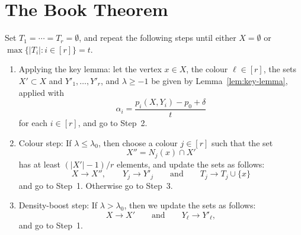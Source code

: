 
\section{The Book Theorem}


\begin{algorithm}\label{alg:book}
  Set \(T_1 = \cdots = T_r = \emptyset\), and repeat the following steps until either \(X = \emptyset\) or \(\max\big\{ |T_i| : i \in [r] \big\} = t\). 
  \begin{enumerate}
  \item\label{Alg:Step1} Applying the key lemma: let the vertex \(x \in X\), the colour \(\ell \in [r]\), the sets \(X' \subset X\) and \(Y'_1,\ldots,Y'_r\), and \(\lambda \ge -1\) be given by Lemma~\ref{lem:key-lemma}, applied with
  \begin{equation}\label{def:alpha}
  \alpha_i = \frac{p_i(X,Y_i) - p_0 + \delta}{t}
  \end{equation}
  for each \(i \in [r]\), and go to Step~2.\smallskip
  \item\label{Alg:Step2} Colour step: If \(\lambda \le \lambda_0\), then choose a colour \(j \in [r]\) such that the set
  \begin{equation*}
    X'' = N_j(x) \cap X'
  \end{equation*}
  has at least \((|X'| - 1)/r\) elements, and update the sets as follows:
  \begin{equation*}
    X \to X'', \qquad Y_j \to Y'_j \qquad \text{and} \qquad T_j \to T_j \cup \{x\}
  \end{equation*}
  and go to Step~1. Otherwise go to Step~3.\smallskip
  \item\label{Alg:Step3} Density-boost step: If \(\lambda > \lambda_0\), then we update the sets as follows:
  \begin{equation*}
    X \to X' \qquad \text{and} \qquad Y_\ell \to Y'_\ell,
  \end{equation*}
  and go to Step~1.
  \end{enumerate}  
\end{algorithm}

